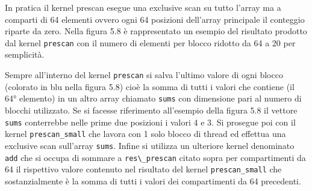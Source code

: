 \documentclass[12pt,a4paper]{report}
\begin{document}
 In pratica il kernel prescan esegue una exclusive scan su tutto l’array ma a comparti di 64 elementi ovvero ogni 64 posizioni dell’array principale il conteggio riparte da zero. \newline 
Nella figura 5.8 è rappresentato un esempio del risultato prodotto dal kernel \verb|prescan| con il numero di elementi per blocco ridotto da 64 a 20 per semplicità.
\begin{figure}[H]
\centering
\begin{floatrow}[1]
\end{floatrow}
\end{figure} 
Sempre all’interno del kernel \verb|prescan| si salva l’ultimo valore di ogni blocco (colorato in blu nella figura 5.8) cioè la somma di tutti i valori che contiene (il 64° elemento) in un altro array chiamato \verb|sums| con dimensione pari al numero di blocchi utilizzato. Se si facesse riferimento all'esempio della figura 5.8 il vettore \verb|sums| conterrebbe nelle prime due posizioni i valori 4 e 3.
Si prosegue poi con il kernel \verb|prescan_small| che lavora con 1 solo blocco di thread ed effettua una exclusive scan sull’array \verb|sums|.
Infine si utilizza un ulteriore kernel denominato \verb|add| che si occupa di sommare a \verb|res\_prescan| citato sopra per compartimenti da 64 il rispettivo valore contenuto nel risultato del kernel \verb|prescan_small| che sostanzialmente è la somma di tutti i valori dei compartimenti da 64 precedenti. \newpage
\end{document}
